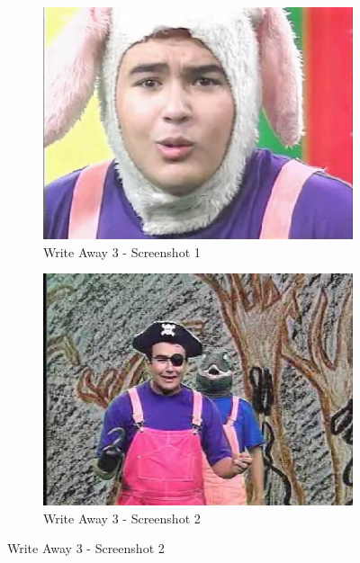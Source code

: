\begin{figure}[H]
    \centering
    \begin{subfigure}{0.45\textwidth}
        \centering
        \includegraphics[width=\linewidth]{Games/WriteAway/Images/WriteAway3Screenshot1.png}
        \caption{Write Away 3 - Screenshot 1}
    \end{subfigure}
    \begin{subfigure}{0.45\textwidth}
        \centering
        \includegraphics[width=\linewidth]{Games/WriteAway/Images/WriteAway3Screenshot2.png}
        \caption{Write Away 3 - Screenshot 2}
    \end{subfigure}


\end{figure}
